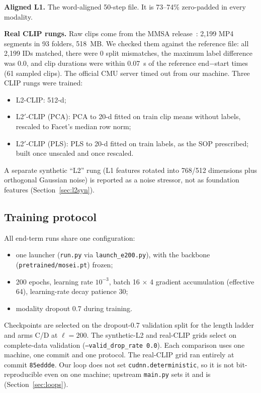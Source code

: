 \documentclass[lettersize,journal]{IEEEtran}
\begin{document}
\textbf{Aligned L1.} The word-aligned 50-step file. It is 73--74\% zero-padded in every modality.

\textbf{Real CLIP rungs.} Raw clips come from the MMSA release~\cite{mao2022msena}: 2,199 MP4 segments in 93 folders, 518~MB. We checked them against the reference file: all 2,199 IDs matched, there were 0 split mismatches, the maximum label difference was 0.0, and clip durations were within 0.07~s of the reference end$-$start times (61 sampled clips). The official CMU server timed out from our machine. Three CLIP rungs were trained:
\begin{itemize}
\item L2-CLIP: 512-d;
\item L2$'$-CLIP (PCA): PCA to 20-d fitted on train clip means without labels, rescaled to Facet's median row norm;
\item L2$'$-CLIP (PLS): PLS to 20-d fitted on train labels, as the SOP prescribed; built once unscaled and once rescaled.
\end{itemize}
A separate synthetic ``L2'' rung (L1 features rotated into 768/512 dimensions plus orthogonal Gaussian noise) is reported as a noise stressor, not as foundation features (Section~\ref{sec:l2syn}).

\subsection{Training protocol}
All end-term runs share one configuration:
\begin{itemize}
\item one launcher (\texttt{run.py} via \texttt{launch\_e200.py}), with the backbone (\texttt{pretrained/mosei.pt}) frozen;
\item 200 epochs, learning rate $10^{-3}$, batch 16 $\times$ 4 gradient accumulation (effective 64), learning-rate decay patience 30;
\item modality dropout 0.7 during training.
\end{itemize}
Checkpoints are selected on the dropout-0.7 validation split for the length ladder and arms C/D at $\ell=200$. The synthetic-L2 and real-CLIP grids select on complete-data validation (\texttt{--valid\_drop\_rate 0.0}). Each comparison uses one machine, one commit and one protocol. The real-CLIP grid ran entirely at commit \texttt{85eddde}. Our loop does not set \texttt{cudnn.deterministic}, so it is not bit-reproducible even on one machine; upstream \texttt{main.py} sets it and is (Section~\ref{sec:loops}).
\end{document}
